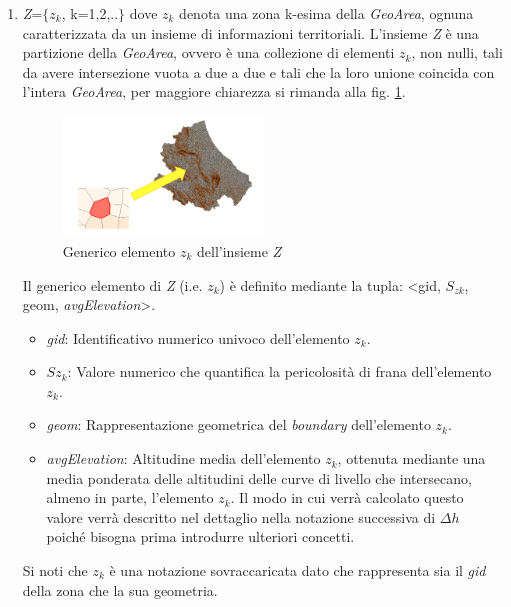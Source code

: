 \begin{enumerate}
\item\textit{Z}=$\{${$z_k$}, k=1,2,..$\}$ dove $z_k$ denota una zona k-esima della \textit{GeoArea}, ognuna caratterizzata da un insieme di informazioni territoriali. L'insieme \textit{Z} è una partizione della \textit{GeoArea}, ovvero è una collezione di elementi $z_k$, non nulli, tali da avere intersezione vuota a due a due e tali che la loro unione coincida con l'intera \textit{GeoArea}, per maggiore chiarezza si rimanda alla fig. \ref{fig:geoarea}.  
\begin{figure}[h]
\centering
\includegraphics[width=0.5\textwidth]{img/zeta}
\caption{Generico elemento $z_k$ dell'insieme \textit{Z}}
	\label{fig:geoarea}
\end{figure}
\newpage
Il generico elemento di \textit{Z} (i.e. $z_k$) è definito mediante la tupla: <gid, $S_{zk}$, geom, \textit{avgElevation}>.
\begin{itemize}
\item \textit{gid}: Identificativo numerico univoco dell'elemento $z_k$.
\item \textit{$Sz_k$}: Valore numerico che quantifica la pericolosità di frana dell'elemento $z_k$. 
\item \textit{geom}: Rappresentazione geometrica del \textit{boundary} dell'elemento $z_k$.

\item \textit{avgElevation}: Altitudine media dell'elemento $z_k$, ottenuta mediante una media ponderata delle altitudini delle curve di livello che intersecano, almeno in parte, l'elemento $z_k$. Il modo in cui verrà calcolato questo valore verrà descritto nel dettaglio nella notazione successiva di $\Delta{h}$ poiché bisogna prima introdurre ulteriori concetti.
\end{itemize}
Si noti che $z_k$ è una notazione sovraccaricata dato che rappresenta sia il \textit{gid} della zona che la sua geometria.


\end{enumerate}
